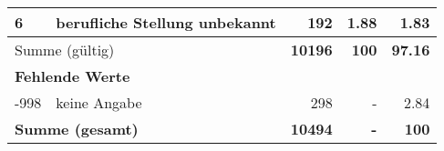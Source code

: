 \begin{longtable}{lXrrr}
     6 &
     \multicolumn{1}{X}{ berufliche Stellung unbekannt   } &


       \num{192} &
       \num[round-mode=places,round-precision=2]{1,88} &
         \num[round-mode=places,round-precision=2]{1,83} \\
     \midrule
     \multicolumn{2}{l}{Summe (gültig)} &
       \textbf{\num{10196}} &
     \textbf{100} &
       \textbf{\num[round-mode=places,round-precision=2]{97,16}} \\
     \multicolumn{5}{l}{\textbf{Fehlende Werte}}\\
       -998 &
       keine Angabe &
         \num{298} &
        - &
         \num[round-mode=places,round-precision=2]{2,84} \\
     \midrule
     \multicolumn{2}{l}{\textbf{Summe (gesamt)}} &
          \textbf{\num{10494}} &
        \textbf{-} &
        \textbf{100} \\
     \bottomrule
     \end{longtable}
     
